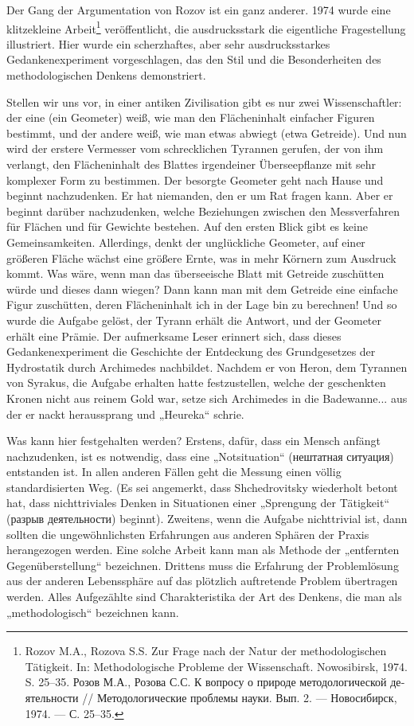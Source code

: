\documentclass[11pt,a4paper]{article}
\begin{document}
Der Gang der Argumentation von Rozov ist ein ganz anderer. 1974 wurde eine
klitzekleine Arbeit\footnote{Rozov M.A., Rozova S.S. Zur Frage nach der Natur
  der methodologischen Tätigkeit. In: Methodologische Probleme der
  Wissenschaft. Nowosibirsk, 1974. S. 25–35.  \foreignlanguage{russian}{Розов
    М.А., Розова С.С. К вопросу о природе методологической деятельности //
    Методологические проблемы науки. Вып. 2. — Новосибирск, 1974. —
    С. 25–35.}} veröffentlicht, die ausdrucksstark die eigentliche
Fragestellung illustriert. Hier wurde ein scherzhaftes, aber sehr
ausdrucksstarkes Gedankenexperiment vorgeschlagen, das den Stil und die
Besonderheiten des methodologischen Denkens demonstriert.

Stellen wir uns vor, in einer antiken Zivilisation gibt es nur zwei
Wissenschaftler: der eine (ein Geometer) weiß, wie man den Flächeninhalt
einfacher Figuren bestimmt, und der andere weiß, wie man etwas abwiegt (etwa
Getreide). Und nun wird der erstere Vermesser vom schrecklichen Tyrannen
gerufen, der von ihm verlangt, den Flächeninhalt des Blattes irgendeiner
Überseepflanze mit sehr komplexer Form zu bestimmen.  Der besorgte Geometer
geht nach Hause und beginnt nachzudenken. Er hat niemanden, den er um Rat
fragen kann. Aber er beginnt darüber nachzudenken, welche Beziehungen zwischen
den Messverfahren für Flächen und für Gewichte bestehen. Auf den ersten Blick
gibt es keine Gemeinsamkeiten. Allerdings, denkt der unglückliche Geometer,
auf einer größeren Fläche wächst eine größere Ernte, was in mehr Körnern zum
Ausdruck kommt. Was wäre, wenn man das überseeische Blatt mit Getreide
zuschütten würde und dieses dann wiegen? Dann kann man mit dem Getreide eine
einfache Figur zuschütten, deren Flächeninhalt ich in der Lage bin zu
berechnen! Und so wurde die Aufgabe gelöst, der Tyrann erhält die Antwort, und
der Geometer erhält eine Prämie. Der aufmerksame Leser erinnert sich, dass
dieses Gedankenexperiment die Geschichte der Entdeckung des Grundgesetzes der
Hydrostatik durch Archimedes nachbildet. Nachdem er von Heron, dem Tyrannen
von Syrakus, die Aufgabe erhalten hatte festzustellen, welche der geschenkten
Kronen nicht aus reinem Gold war, setze sich Archimedes in die Badewanne...
aus der er nackt heraussprang und „Heureka“ schrie.

Was kann hier festgehalten werden? Erstens, dafür, dass ein Mensch anfängt
nachzudenken, ist es notwendig, dass eine „Notsituation“
(\foreignlanguage{russian}{нештатная ситуация}) entstanden ist. In allen
anderen Fällen geht die Messung einen völlig standardisierten Weg. (Es sei
angemerkt, dass Shchedrovitsky wiederholt betont hat, dass nichttriviales
Denken in Situationen einer „Sprengung der Tätigkeit“
(\foreignlanguage{russian}{разрыв деятельности}) beginnt). Zweitens, wenn die
Aufgabe nichttrivial ist, dann sollten die ungewöhnlichsten Erfahrungen aus
anderen Sphären der Praxis herangezogen werden. Eine solche Arbeit kann man
als Methode der „entfernten Gegenüberstellung“ bezeichnen. Drittens muss die
Erfahrung der Problemlösung aus der anderen Lebenssphäre auf das plötzlich
auftretende Problem übertragen werden. Alles Aufgezählte sind Charakteristika
der Art des Denkens, die man als „methodologisch“ bezeichnen kann.
\end{document}
